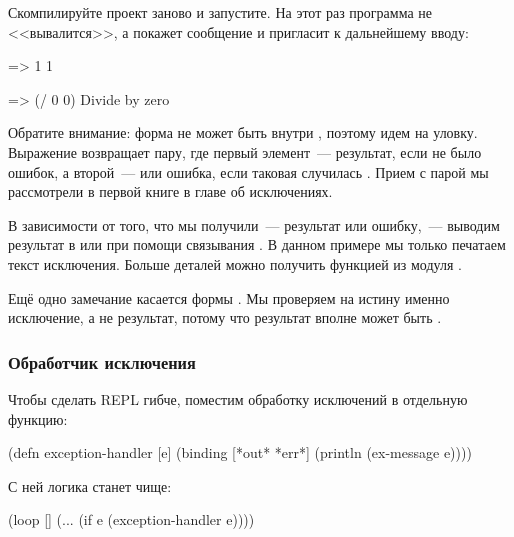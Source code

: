 Скомпилируйте проект заново и запустите. На этот раз программа не <<вывалится>>, а покажет сообщение и пригласит к дальнейшему вводу:

\begin{english}
  \begin{clojure}
=> 1
1

=> (/ 0 0)
Divide by zero
  \end{clojure}
\end{english}


Обратите внимание: форма  не может быть внутри , поэтому идем на уловку. Выражение  возвращает пару, где первый элемент~--- результат, если не было ошибок, а второй~---  или ошибка, если таковая случилась . Прием с парой мы рассмотрели в первой книге в главе об исключениях.

В зависимости от того, что мы получили~--- результат или ошибку,~--- выводим результат в  или  при помощи связывания . В данном примере мы только печатаем текст исключения. Больше деталей можно получить функцией  из модуля .


Ещё одно замечание касается формы  . Мы проверяем на истину именно исключение, а не результат, потому что результат вполне может быть .

\subsubsection{Обработчик исключения}

Чтобы сделать REPL гибче, поместим обработку исключений в отдельную функцию:

\begin{english}
  \begin{clojure}
(defn exception-handler [e]
  (binding [*out* *err*]
    (println (ex-message e))))
  \end{clojure}
\end{english}

С ней логика  станет чище:

\begin{english}
  \begin{clojure}
(loop []
  (...
   (if e
     (exception-handler e))))
  \end{clojure}
\end{english}

